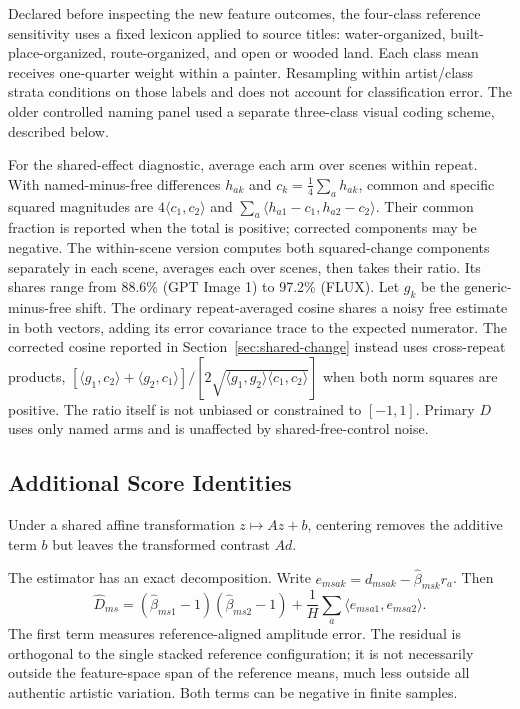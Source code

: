 Declared before inspecting the new feature outcomes, the four-class reference
sensitivity uses a fixed lexicon applied to source titles: water-organized, built-place-organized, route-organized, and open or
wooded land. Each class mean receives one-quarter weight within a painter.
Resampling within artist/class strata conditions on those labels and does not
account for classification error. The older controlled naming panel used a
separate three-class visual coding scheme, described below.

For the shared-effect diagnostic, average each arm over scenes within repeat.
With named-minus-free differences $h_{ak}$ and $c_k=\frac14\sum_a h_{ak}$,
common and specific squared magnitudes are $4\langle c_1,c_2\rangle$ and
$\sum_a\langle h_{a1}-c_1,h_{a2}-c_2\rangle$. Their common fraction is reported
when the total is positive; corrected components may be negative. The within-scene
version computes both squared-change components separately in each scene,
averages each over scenes, then takes their ratio. Its shares range from 88.6\%
(GPT Image 1) to 97.2\% (FLUX).
Let $g_k$ be the generic-minus-free shift. The ordinary repeat-averaged cosine
shares a noisy free estimate in both vectors, adding its error covariance trace
to the expected numerator. The corrected cosine reported in
Section~\ref{sec:shared-change} instead uses cross-repeat products,
$[\langle g_1,c_2\rangle+\langle g_2,c_1\rangle]/
[2\sqrt{\langle g_1,g_2\rangle\langle c_1,c_2\rangle}]$ when both norm squares
are positive. The ratio itself is not unbiased or constrained to $[-1,1]$.
Primary $D$ uses only named arms and is unaffected by shared-free-control noise.

\subsection{Additional Score Identities}\label{app:score-details}
Under a shared affine transformation $z\mapsto Az+b$, centering removes
the additive term $b$ but leaves the transformed contrast $Ad$.

The estimator has an exact decomposition. Write
$e_{msak}=d_{msak}-\widehat\beta_{msk}r_a$. Then
\begin{equation}
 \widehat D_{ms}=
 (\widehat\beta_{ms1}-1)(\widehat\beta_{ms2}-1)
 +\frac1H\sum_a\langle e_{msa1},e_{msa2}\rangle.
 \label{eq:decomposition}
\end{equation}
The first term measures reference-aligned amplitude error. The residual is
orthogonal to the single stacked reference configuration; it is not necessarily
outside the feature-space span of the reference means, much less outside all
authentic artistic variation. Both terms can be negative in finite samples.


